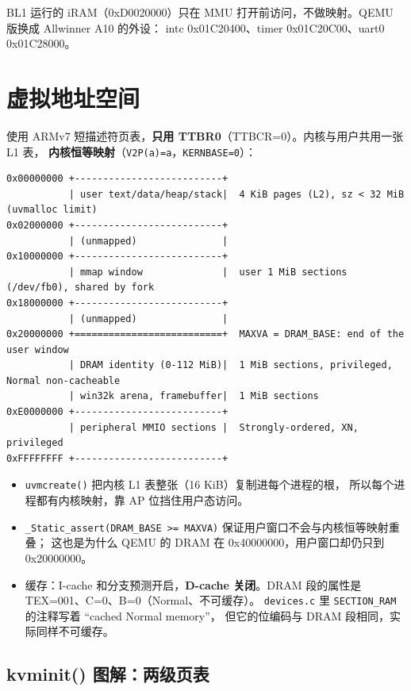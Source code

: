 BL1 运行的 iRAM（0xD0020000）只在 MMU 打开前访问，不做映射。QEMU 版换成 Allwinner A10 的外设：
intc 0x01C20400、timer 0x01C20C00、uart0 0x01C28000。

\section{虚拟地址空间}

使用 ARMv7 短描述符页表，\textbf{只用 TTBR0}（TTBCR=0）。内核与用户共用一张 L1 表，
\textbf{内核恒等映射}（\texttt{V2P(a)=a}，\texttt{KERNBASE=0}）：

\begin{lstlisting}
0x00000000 +--------------------------+
           | user text/data/heap/stack|  4 KiB pages (L2), sz < 32 MiB (uvmalloc limit)
0x02000000 +--------------------------+
           | (unmapped)               |
0x10000000 +--------------------------+
           | mmap window              |  user 1 MiB sections (/dev/fb0), shared by fork
0x18000000 +--------------------------+
           | (unmapped)               |
0x20000000 +==========================+  MAXVA = DRAM_BASE: end of the user window
           | DRAM identity (0-112 MiB)|  1 MiB sections, privileged, Normal non-cacheable
           | win32k arena, framebuffer|  1 MiB sections
0xE0000000 +--------------------------+
           | peripheral MMIO sections |  Strongly-ordered, XN, privileged
0xFFFFFFFF +--------------------------+
\end{lstlisting}

\begin{itemize}
\item \texttt{uvmcreate()} 把内核 L1 表整张（16 KiB）复制进每个进程的根，
      所以每个进程都有内核映射，靠 AP 位挡住用户态访问。
\item \texttt{\_Static\_assert(DRAM\_BASE >= MAXVA)} 保证用户窗口不会与内核恒等映射重叠；
      这也是为什么 QEMU 的 DRAM 在 0x40000000，用户窗口却仍只到 0x20000000。
\item 缓存：I-cache 和分支预测开启，\textbf{D-cache 关闭}。DRAM 段的属性是 TEX=001、C=0、B=0（Normal、不可缓存）。
      \texttt{devices.c} 里 \texttt{SECTION\_RAM} 的注释写着 ``cached Normal memory''，
      但它的位编码与 DRAM 段相同，实际同样不可缓存。
\end{itemize}

\subsection{kvminit() 图解：两级页表}

